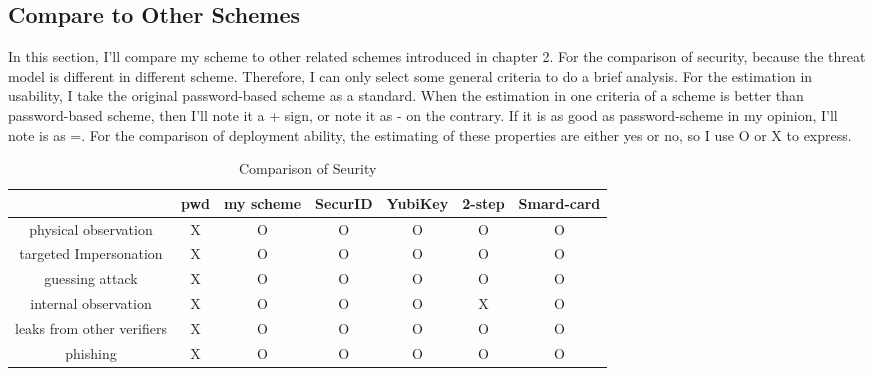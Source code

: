 \begin{CJK}{Bg5}{bsmi}


\chapter{Compare to Other Schemes}

In this section, I'll compare my scheme to other related schemes introduced in chapter 2. For the comparison of security, because the threat model is different in different scheme. Therefore, I can only select some general criteria to do a brief analysis. For the estimation in usability, I take the original password-based scheme as a standard. When the estimation in one criteria of a scheme is better than password-based scheme, then I'll note it a + sign, or note it as - on the contrary. If it is as good as password-scheme in my opinion, I'll note is as =. For the comparison of deployment ability, the estimating of these properties are either yes or no, so I use O or X to express.

\begin{table}[h]
\begin{tabular}{|c|c|c|c|c|c|c|}
\hline
                                 & pwd & my scheme & SecurID & YubiKey & 2-step & Smard-card \\ \hline
physical observation       & X   & O         & O       & O       & O       & O          \\ \hline
targeted Impersonation     & X   & O         & O       & O       & O       & O          \\ \hline
guessing attack            & X   & O         & O       & O       & O       & O          \\ \hline
internal observation       & X   & O         & O       & O       & X       & O          \\ \hline
leaks from other verifiers & X   & O         & O       & O       & O       & O          \\ \hline
phishing                   & X   & O         & O       & O       & O       & O          \\ \hline
\end{tabular}
\caption{Comparison of Seurity}
\end{table}


\end{CJK}
